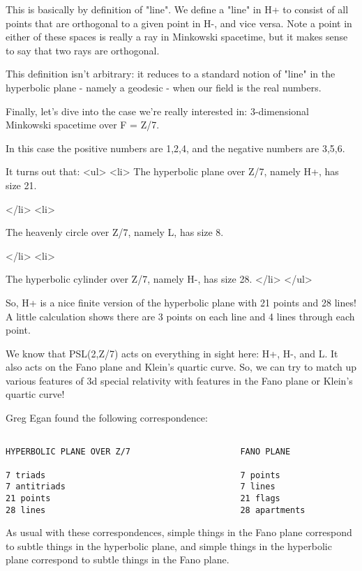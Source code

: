 This is basically by definition of "line".  We define a "line" in H+ to consist 
of all points that are orthogonal to a given point in H-, and vice versa.
Note a point in either of these spaces is really a ray in Minkowski spacetime, 
but it makes sense to say that two rays are orthogonal.  


This definition isn't arbitrary: it reduces to a standard notion of "line" in
the hyperbolic plane - namely a geodesic - when our field is the real numbers.


Finally, let's dive into the case we're really interested in: 
3-dimensional Minkowski spacetime over F = Z/7.


In this case the positive numbers are 1,2,4, and the negative numbers
are 3,5,6.  

It turns out that:
<ul>
<li>
 The hyperbolic plane over Z/7, namely H+, has size 21.  

</li>
<li>

 The heavenly circle over Z/7, namely L, has size 8.

</li>
<li>

 The hyperbolic cylinder over Z/7, namely H-, has size 28.   
</li>
</ul>

So, H+ is a nice finite version of the hyperbolic plane with 21 points and 
28 lines!  A little calculation shows there are 3 points on each line and 
4 lines through each point.

We know that PSL(2,Z/7) acts on everything in sight here: H+, H-, and L.  
It also acts on the Fano plane and Klein's quartic curve.  So, we can try to 
match up various features of 3d special relativity with features in the Fano 
plane or Klein's quartic curve!

Greg Egan found the following correspondence:

\begin{verbatim}

HYPERBOLIC PLANE OVER Z/7                      FANO PLANE    

7 triads                                       7 points  
7 antitriads                                   7 lines       
21 points                                      21 flags     
28 lines                                       28 apartments 
\end{verbatim}
    
As usual with these correspondences, simple things in the Fano plane correspond 
to subtle things in the hyperbolic plane, and simple things in the hyperbolic 
plane correspond to subtle things in the Fano plane.

